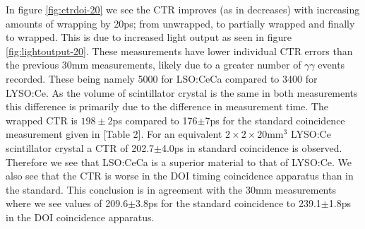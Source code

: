 In figure \ref{fig:ctrdoi-20} we see the CTR improves (as in decreases) with increasing amounts of wrapping by 20ps; from unwrapped, to partially wrapped and finally to wrapped. This is due to increased light output as seen in figure \ref{fig:lightoutput-20}. These measurements have lower individual CTR errors than the previous 30mm measurements, likely due to a greater number of $\gamma\gamma$ events recorded. These being namely 5000 for LSO:CeCa compared to 3400 for LYSO:Ce. As the volume of scintillator crystal is the same in both measurements this difference is primarily due to the difference in measurement time. The wrapped CTR is $198\pm2$ps compared to 176$\pm$7ps for the standard coincidence measurement given in [Table 2]\cite{uffray_Jarron_Meyer_Lecoq_2014}. For an equivalent $2\times2\times20$mm$^3$ LYSO:Ce scintillator crystal a CTR of 202.7$\pm$4.0ps in standard coincidence is observed. Therefore we see that LSO:CeCa is a superior material to that of LYSO:Ce. We also see that the CTR is worse in the DOI timing coincidence apparatus than in the standard. This conclusion is in agreement with the 30mm measurements where we see values of 209.6$\pm$3.8ps for the standard coincidence to 239.1$\pm$1.8ps in the DOI coincidence apparatus.
